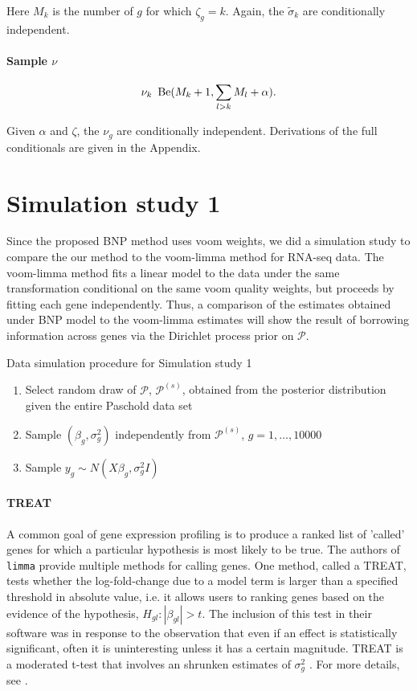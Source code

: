     Here $M_k$ is the number of $g$ for which $\zeta_g = k$. Again, the $\tilde{\sigma}_k$ are conditionally independent.

\paragraph{Sample $\nu$}
\begin{equation*}
\nu_k ~ \operatorname{Be}(M_k + 1, \sum_{l>k}M_l + \alpha).
\end{equation*}

Given $\alpha$ and $\zeta$, the $\nu_g$ are conditionally independent. Derivations of the full conditionals are given in the Appendix.

\section{Simulation study 1}
Since the proposed BNP method uses voom weights, we did a simulation study to compare the our method to the voom-limma method for RNA-seq data. The voom-limma method fits a linear model to the data under the same transformation conditional on the same voom quality weights, but proceeds by fitting each gene independently. Thus, a comparison of the estimates obtained under BNP model to the voom-limma estimates will show the result of borrowing information across genes via the Dirichlet process prior on $\mathcal{P}$.

\begin{table}
\caption{Data simulation procedure for Simulation study 1}
\begin{enumerate}
\item Select random draw of $\mathcal{P}$, $\mathcal{P}^{(s)}$, obtained from the posterior distribution given the entire Paschold data set
\item Sample $(\beta_g,\sigma^2_g)$ independently from $\mathcal{P}^{(s)}$, $g=1,\ldots,10000$
\item Sample $y_{g} \sim N(X\beta_g,\sigma^2_g I)$
\end{enumerate}
\end{table}

\paragraph{TREAT}
A common goal of gene expression profiling is to produce a ranked list of 'called' genes for which a particular hypothesis is most likely to be true. The authors of \texttt{limma} provide multiple methods for calling genes. One method, called a TREAT, tests whether the log-fold-change due to a model term is larger than a specified threshold in absolute value, i.e. it allows users to ranking genes based on the evidence of the hypothesis, $H_{gl}:|\beta_{gl}|>t$. The inclusion of this test in their software was in response to the observation that even if an effect is statistically significant, often it is uninteresting unless it has a certain magnitude. TREAT is a moderated t-test that involves an shrunken estimates of $\sigma^2_g$ \citep{treat}. For more details, see \citet{treat}.

